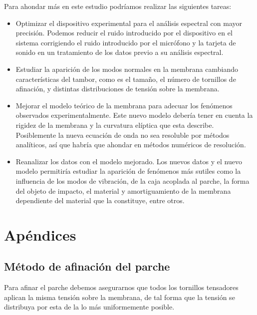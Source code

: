 \documentclass[journal, a4paper,onecolumn]{IEEEtran}
\begin{document}
Para ahondar más en este estudio podríamos realizar las siguientes tareas:

\begin{itemize}

\item Optimizar el dispositivo experimental para el análisis espectral con mayor precisión. Podemos reducir el ruido introducido por el dispositivo en el sistema corrigiendo el ruido introducido por el micrófono y la tarjeta de sonido en un tratamiento de los datos previo a su análisis espectral. 

\item Estudiar la aparición de los modos normales en la membrana cambiando características del tambor, como es el tamaño, el número de tornillos de afinación, y distintas distribuciones de tensión sobre la membrana.

\item Mejorar el modelo teórico de la membrana para adecuar los fenómenos observados experimentalmente. Este nuevo modelo debería tener en cuenta la rigidez de la membrana y la curvatura elíptica que esta describe. Posiblemente la nueva ecuación de onda no sea resoluble por métodos analíticos, así que habría que ahondar en métodos numéricos de resolución.

\item Reanalizar los datos con el modelo mejorado. Los nuevos datos y el nuevo modelo permitiría estudiar la aparición de fenómenos más sutiles como la influencia de los modos de vibración, de la caja acoplada al parche, la forma del objeto de impacto, el material y amortiguamiento de la membrana dependiente del material que la constituye, entre otros.

\end{itemize}

\newpage


\section{Apéndices}
\subsection{Método de afinación del parche}

 Para afinar el parche debemos asegurarnos que todos los tornillos tensadores aplican la misma tensión sobre la membrana, de tal forma que la tensión se distribuya por esta de la lo más uniformemente posible.\newline
 
\end{document}
